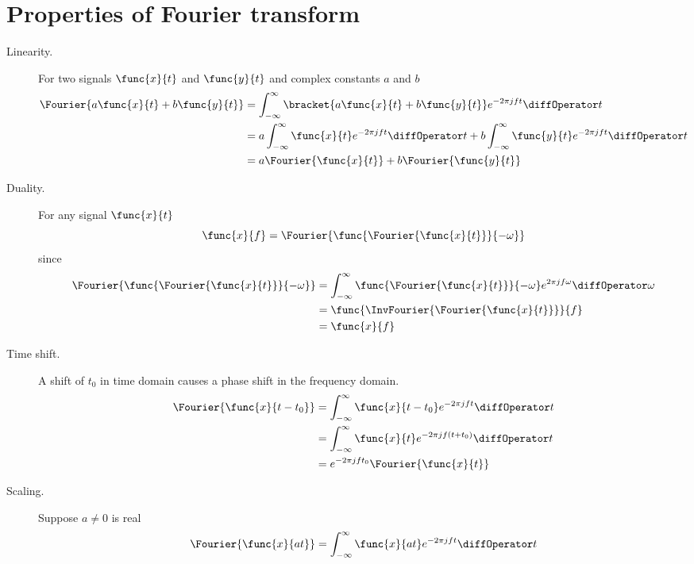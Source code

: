\section{Properties of Fourier transform}
\begin{description}
    \item[Linearity.] For two signals \(\func{x}{t}\) and \(\func{y}{t}\) and complex constants \(a\) and \(b\)
    \begin{align*}
        \Fourier{a \func{x}{t} + b \func{y}{t}} &= \int_{-\infty}^{\infty} \bracket{a \func{x}{t} + b \func{y}{t}} e^{-2\pi j f t} \diffOperator t \\
        &= a  \int_{-\infty}^{\infty}  \func{x}{t} e^{-2\pi j f t} \diffOperator t + b \int_{-\infty}^{\infty} \func{y}{t} e^{-2\pi j f t} \diffOperator t\\
        &= a \Fourier{\func{x}{t}} + b \Fourier{\func{y}{t}}
    \end{align*} 
    \item[Duality.] For any signal \(\func{x}{t}\)
    \begin{equation*}
        \func{x}{f} = \Fourier{\func{\Fourier{\func{x}{t}}}{-\omega}}
    \end{equation*} 
    since 
    \begin{align*}
        \Fourier{\func{\Fourier{\func{x}{t}}}{-\omega}} &= \int_{-\infty}^{\infty} \func{\Fourier{\func{x}{t}}}{-\omega} e^{2 \pi j f \omega } \diffOperator \omega \\
        &= \func{\InvFourier{\Fourier{\func{x}{t}}}}{f} \\
        &= \func{x}{f}
    \end{align*}
    \item [Time shift.] A shift of \(t_0\) in time domain causes a phase shift in the frequency domain.
    \begin{align*}
        \Fourier{\func{x}{t - t_0}} &= \int_{-\infty}^{\infty} \func{x}{t - t_0} e^{-2 \pi j f t} \diffOperator t\\
        &= \int_{-\infty}^{\infty} \func{x}{t} e^{-2 \pi j f (t + t_0)} \diffOperator t \\
        &= e^{-2 \pi j f t_0 } \Fourier{\func{x}{t}}
    \end{align*}
    \item [Scaling. ] Suppose \(a \neq 0\) is real
    \begin{align*}
        \Fourier{\func{x}{at}} &= \int_{-\infty}^{\infty} \func{x}{at} e^{-2 \pi j f t} \diffOperator t\\

\end{align*}
\end{description}
